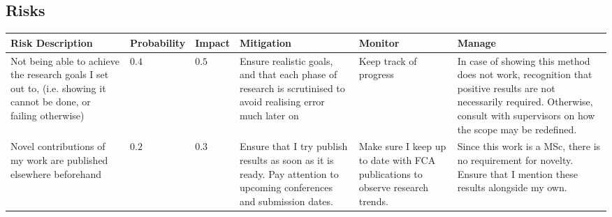 \subsection{Risks}
\label{appendix: risks}

\begin{table}[!ht]
    \begin{tabularx}{\linewidth}{>{\justifying\arraybackslash}X>{\centering\arraybackslash}p{2cm}>{\centering\arraybackslash}p{2cm}>{\justifying\arraybackslash}X>{\justifying\arraybackslash}X>{\justifying\arraybackslash}X}
        \hline
        \textbf{Risk Description}                                                                                         & \textbf{Probability} & \textbf{Impact} & \textbf{Mitigation}                                                                                                                                                                                                & \textbf{Monitor}                                                                                            & \textbf{Manage}                                                                                                                                                                      \\
        \hline
        Not being able to achieve the research goals I set out to, (i.e. showing it cannot be done, or failing otherwise) & $0.4$                & $0.5$           & Ensure realistic goals, and that each phase of research is scrutinised to avoid realising error much later on                                                                                                      & Keep track of progress                                                                                      & In case of showing this method does not work, recognition that positive results are not necessarily required. Otherwise, consult with supervisors on how the scope may be redefined. \\
        Novel contributions of my work are published elsewhere beforehand                                                 & $0.2$                & $0.3$           & Ensure that I try publish results as soon as it is ready. Pay attention to upcoming conferences and submission dates.                                                                                              & Make sure I keep up to date with FCA publications to observe research trends.                               & Since this work is a MSc, there is no requirement for novelty. Ensure that I mention these results alongside my own.                                                                 \\

\end{tabularx}
\end{table}

